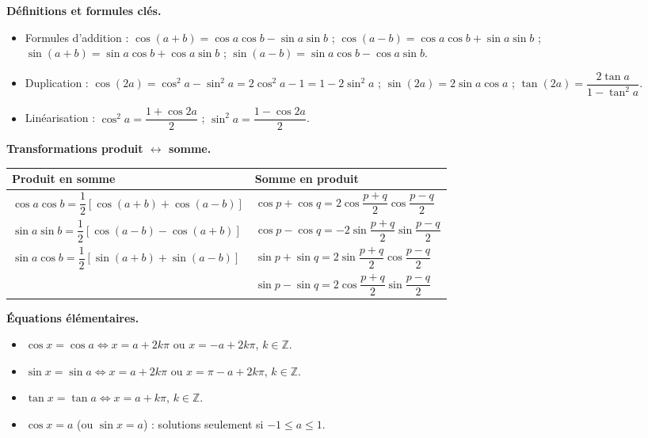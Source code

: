 \documentclass[11pt]{article}
\newcommand{\cle}[1]{{\popxbold\color{popdark}#1}}
\begin{document}
\begin{bilan}
\textbf{Définitions et formules clés.}
\begin{itemize}
\item \cle{Formules d'addition} : $\cos(a+b)=\cos a\cos b-\sin a\sin b$ ; $\cos(a-b)=\cos a\cos b+\sin a\sin b$ ; $\sin(a+b)=\sin a\cos b+\cos a\sin b$ ; $\sin(a-b)=\sin a\cos b-\cos a\sin b$.
\item \cle{Duplication} : $\cos(2a)=\cos^2 a-\sin^2 a=2\cos^2 a-1=1-2\sin^2 a$ ; $\sin(2a)=2\sin a\cos a$ ; $\tan(2a)=\dfrac{2\tan a}{1-\tan^2 a}$.
\item \cle{Linéarisation} : $\cos^2 a=\dfrac{1+\cos 2a}{2}$ ; $\sin^2 a=\dfrac{1-\cos 2a}{2}$.
\end{itemize}

\textbf{Transformations produit $\leftrightarrow$ somme.}
\begin{center}
\begin{tabularx}{\linewidth}{|X|X|}
\hline
\rowcolor{popblueL} \textbf{Produit en somme} & \textbf{Somme en produit} \\
\hline
$\cos a\cos b=\dfrac{1}{2}[\cos(a+b)+\cos(a-b)]$ & $\cos p+\cos q=2\cos\dfrac{p+q}{2}\cos\dfrac{p-q}{2}$ \\
\hline
$\sin a\sin b=\dfrac{1}{2}[\cos(a-b)-\cos(a+b)]$ & $\cos p-\cos q=-2\sin\dfrac{p+q}{2}\sin\dfrac{p-q}{2}$ \\
\hline
$\sin a\cos b=\dfrac{1}{2}[\sin(a+b)+\sin(a-b)]$ & $\sin p+\sin q=2\sin\dfrac{p+q}{2}\cos\dfrac{p-q}{2}$ \\
\hline
 & $\sin p-\sin q=2\cos\dfrac{p+q}{2}\sin\dfrac{p-q}{2}$ \\
\hline
\end{tabularx}
\end{center}

\textbf{Équations élémentaires.}
\begin{itemize}
\item $\cos x=\cos a \iff x=a+2k\pi$ ou $x=-a+2k\pi$, $k\in\mathbb{Z}$.
\item $\sin x=\sin a \iff x=a+2k\pi$ ou $x=\pi-a+2k\pi$, $k\in\mathbb{Z}$.
\item $\tan x=\tan a \iff x=a+k\pi$, $k\in\mathbb{Z}$.
\item $\cos x=a$ (ou $\sin x=a$) : solutions seulement si $-1\leq a\leq 1$.
\end{itemize}


\end{bilan}
\end{document}
